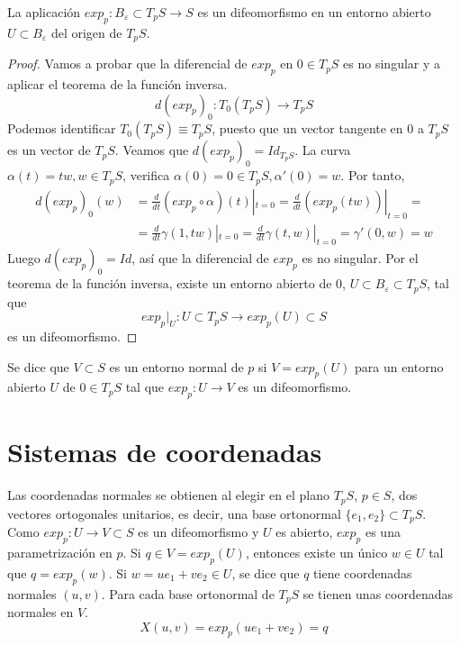 \begin{proposition}
    La aplicación $exp_p : B_\varepsilon \subset T_pS \to S$ es un difeomorfismo en un entorno abierto $U \subset B_\varepsilon$ del origen de $T_pS$.

    \begin{proof}
        Vamos a probar que la diferencial de $exp_p$ en $0 \in T_pS$ es no singular y a aplicar el teorema de la función inversa.
        $$d(exp_p)_0: T_0(T_pS) \to T_pS$$
        Podemos identificar $T_0(T_pS) \equiv T_pS$, puesto que un vector tangente en 0 a $T_pS$ es un vector de $T_pS$.
        Veamos que $d(exp_p)_0 = Id_{T_pS}$.
        La curva $\alpha(t) = tw, w \in T_pS$, verifica $\alpha(0) = 0 \in T_pS, \alpha'(0) = w$.
        Por tanto,
        \begin{align*}
            d(exp_p)_0(w) & = \frac{d}{dt} (exp_p \circ \alpha)(t)|_{t=0} = \frac{d}{dt} (exp_p(tw))|_{t=0} =          \\
                          & = \frac{d}{dt} \gamma(1, tw)|_{t=0} = \frac{d}{dt} \gamma(t, w)|_{t=0} = \gamma'(0, w) = w
        \end{align*}
        Luego $d(exp_p)_0 = Id$, así que la diferencial de $exp_p$ es no singular.
        Por el teorema de la función inversa, existe un entorno abierto de 0, $U \subset B_\varepsilon \subset T_pS$, tal que
        $$exp_p|_U: U \subset T_pS \to exp_p(U) \subset S$$
        es un difeomorfismo.
    \end{proof}
\end{proposition}



\begin{definition}
    Se dice que $V \subset S$ es un entorno normal de $p$ si $V = exp_p(U)$ para un entorno abierto $U$ de $0 \in T_pS$ tal que $exp_p : U \to V$ es un difeomorfismo.
\end{definition}

\section{Sistemas de coordenadas}

\begin{definition}
    Las coordenadas normales se obtienen al elegir en el plano $T_pS$, $p \in S$, dos vectores ortogonales unitarios, es decir, una base ortonormal $\{e_1, e_2\} \subset T_pS$.\\
    Como $exp_p : U \to V \subset S$ es un difeomorfismo y $U$ es abierto, $exp_p$ es una parametrización en $p$.
    Si $q \in V = exp_p(U)$, entonces existe un único $w \in U$ tal que $q = exp_p(w)$.
    Si $w = ue_1 + ve_2 \in U$, se dice que $q$ tiene coordenadas normales $(u, v)$.
    Para cada base ortonormal de $T_pS$ se tienen unas coordenadas normales en $V$.
    $$X(u, v) = exp_p(ue_1 + ve_2) = q$$
\end{definition}


